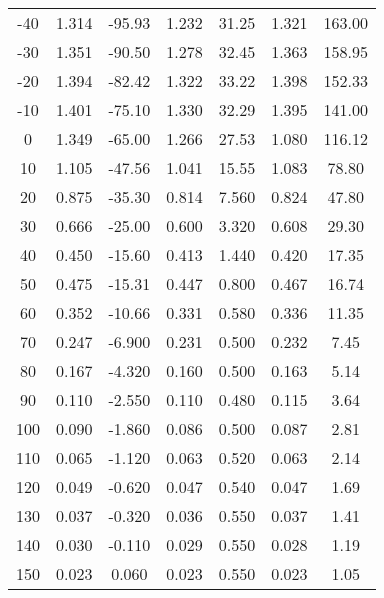 \begin{table}
\begin{center}
\begin{tabular}{c|cc|cc|cc}
		-40 & 1.314 & -95.93 & 1.232 & 31.25	& 1.321 &	163.00 \\
		-30 & 1.351 & -90.50 & 1.278 & 32.45	& 1.363 &	158.95 \\
		-20 & 1.394 & -82.42 & 1.322 & 33.22	& 1.398 &	152.33 \\
		-10 & 1.401 & -75.10 & 1.330 & 32.29	& 1.395 &	141.00 \\
		0	& 1.349 & -65.00 & 1.266 & 27.53 & 1.080 & 116.12 \\
		10 & 1.105 & -47.56 & 1.041 & 15.55 & 1.083 & 78.80 \\
		20 & 0.875 & -35.30 & 0.814 & 7.560 & 0.824 & 47.80 \\
		30 & 0.666 & -25.00 & 0.600 & 3.320 & 0.608 & 29.30 \\
		40 & 0.450 & -15.60 & 0.413 & 1.440 & 0.420 & 17.35 \\
		50 & 0.475 & -15.31 & 0.447 & 0.800 & 0.467 & 16.74 \\
		60 & 0.352 & -10.66 & 0.331 & 0.580 & 0.336 & 11.35 \\
		70 & 0.247 & -6.900 & 0.231 & 0.500 & 0.232 & 7.45 \\
		80 & 0.167 & -4.320 & 0.160 & 0.500 & 0.163 & 5.14 \\
		90 & 0.110 & -2.550 & 0.110 & 0.480 & 0.115 & 3.64 \\
		100	& 0.090 &	-1.860 & 0.086 & 0.500 & 0.087 & 2.81 \\
		110	& 0.065 &	-1.120 & 0.063 & 0.520 & 0.063 & 2.14 \\
		120	& 0.049 &	-0.620 & 0.047 & 0.540 & 0.047 & 1.69 \\
		130	& 0.037 &	-0.320 & 0.036 & 0.550 & 0.037 & 1.41 \\
		140	& 0.030 &	-0.110 & 0.029 & 0.550 & 0.028 & 1.19 \\
		150	& 0.023	& 0.060	& 0.023 &	0.550 &	0.023 &	1.05 \\
  \end{tabular}
	\label{tab:probe_A}
	\end{center}

\end{table}
\endgroup
